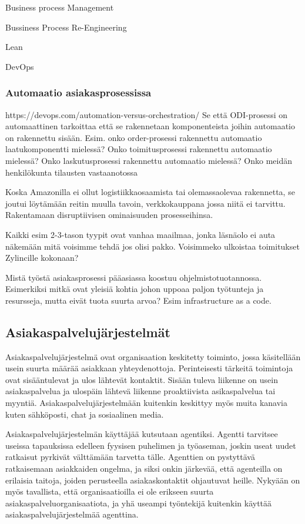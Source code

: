 \documentclass[finnish,12pt,a4paper,pdftex]{article}
\begin{document}
Business process Management

Bussiness Process Re-Engineering

Lean



DevOps
\subsubsection{Automaatio asiakasprosessissa}
https://devops.com/automation-versus-orchestration/ 
Se että ODI-prosessi on automaattinen tarkoittaa että se rakennetaan komponenteista joihin automaatio on rakennettu sisään. Esim. onko order-prosessi rakennettu automaatio laatukomponentti mielessä? Onko toimitusprosessi rakennettu automaatio mielessä? Onko laskutusprosessi rakennettu automaatio mielessä?
Onko meidän henkilökunta tilausten vastaanotossa 

Koska Amazonilla ei ollut logistiikkaosaamista tai olemassaolevaa rakennetta, se joutui löytämään reitin muulla tavoin, verkkokauppana jossa niitä ei tarvittu. Rakentamaan disruptiivisen ominaisuuden prosesseihinsa.

Kaikki esim 2-3-tason tyypit ovat vanhaa maailmaa, jonka läsnäolo ei auta näkemään mitä voisimme tehdä jos olisi pakko. Voisimmeko ulkoistaa toimitukset Zylincille kokonaan?

Mistä työstä asiakasprosessi pääasiassa koostuu ohjelmistotuotannossa. Esimerkiksi mitkä ovat yleisiä kohtia johon uppoaa paljon työtunteja ja resursseja, mutta eivät tuota suurta arvoa? Esim infrastructure as a code.





\subsection{Asiakaspalvelujärjestelmät}

Asiakaspalvelujärjestelmä ovat organisaation keskitetty toiminto, jossa käsitellään usein suurta määrää asiakkaan yhteydenottoja. Perinteisesti tärkeitä toimintoja ovat sisääntulevat ja ulos lähtevät kontaktit. Sisään tuleva liikenne on usein asiakaspalvelua ja ulospäin lähtevä liikenne proaktiivista asikaspalvelua tai myyntiä. Asiakaspalvelujärjestelmään kuitenkin keskittyy myös muita kanavia kuten sähköposti, chat ja sosiaalinen media.

Asiakaspalvelujärjestelmän käyttäjää kutsutaan agentiksi. Agentti tarvitsee useissa tapauksissa edelleen fyysisen puhelimen ja työaseman, joskin useat uudet ratkaisut pyrkivät välttämään tarvetta tälle. Agenttien on pystyttävä ratkaisemaan asiakkaiden ongelma, ja siksi onkin järkevää, että agenteilla on erilaisia taitoja, joiden perusteella asiakaskontaktit ohjautuvat heille. Nykyään on myös tavallista, että organisaatioilla ei ole erikseen suurta asiakaspalveluorganisaatiota, ja yhä useampi työntekijä kuitenkin käyttää asiakaspalvelujärjestelmää agenttina. 
\end{document}
